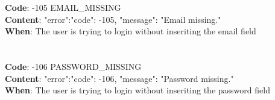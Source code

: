 \begin{itemize}
    \\
    \\
    \textbf{Code}: -105 EMAIL\_MISSING\\
    \textbf{Content}: {"error":{"code": -105, "message": "Email missing."}}\\
    \textbf{When}: The user is trying to login without inseriting the email field\\
    \\
    \\
    \textbf{Code}: -106 PASSWORD\_MISSING\\
    \textbf{Content}: {"error":{"code": -106, "message": "Password missing."}}\\
    \textbf{When}: The user is trying to login without inseriting the password field\\
    \\
    \\
\end{itemize}

